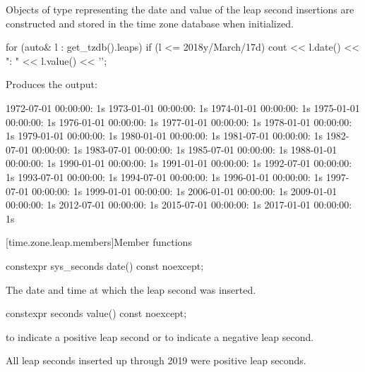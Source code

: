 \pnum
Objects of type  representing
the date and value of the leap second insertions
are constructed and stored in the time zone database when initialized.

\pnum
\begin{example}
\begin{codeblock}
for (auto& l : get_tzdb().leaps)
  if (l <= 2018y/March/17d)
    cout << l.date() << ": " << l.value() << '\n';
\end{codeblock}

Produces the output:

\begin{outputblock}
1972-07-01 00:00:00: 1s
1973-01-01 00:00:00: 1s
1974-01-01 00:00:00: 1s
1975-01-01 00:00:00: 1s
1976-01-01 00:00:00: 1s
1977-01-01 00:00:00: 1s
1978-01-01 00:00:00: 1s
1979-01-01 00:00:00: 1s
1980-01-01 00:00:00: 1s
1981-07-01 00:00:00: 1s
1982-07-01 00:00:00: 1s
1983-07-01 00:00:00: 1s
1985-07-01 00:00:00: 1s
1988-01-01 00:00:00: 1s
1990-01-01 00:00:00: 1s
1991-01-01 00:00:00: 1s
1992-07-01 00:00:00: 1s
1993-07-01 00:00:00: 1s
1994-07-01 00:00:00: 1s
1996-01-01 00:00:00: 1s
1997-07-01 00:00:00: 1s
1999-01-01 00:00:00: 1s
2006-01-01 00:00:00: 1s
2009-01-01 00:00:00: 1s
2012-07-01 00:00:00: 1s
2015-07-01 00:00:00: 1s
2017-01-01 00:00:00: 1s
\end{outputblock}
\end{example}

[time.zone.leap.members]{Member functions}

%
\begin{itemdecl}
constexpr sys_seconds date() const noexcept;
\end{itemdecl}

\begin{itemdescr}
\pnum
\returns
The date and time at which the leap second was inserted.
\end{itemdescr}

%
\begin{itemdecl}
constexpr seconds value() const noexcept;
\end{itemdecl}

\begin{itemdescr}
\pnum
\returns
{} to indicate a positive leap second or
 to indicate a negative leap second.
\begin{note}
All leap seconds inserted up through 2019 were positive leap seconds.
\end{note}
\end{itemdescr}

